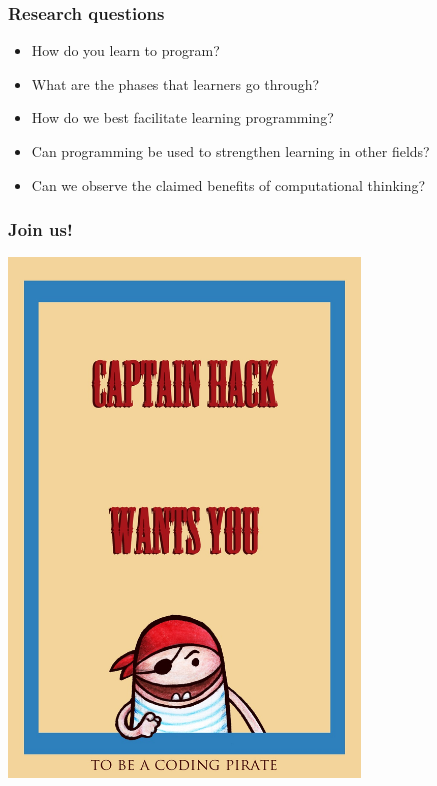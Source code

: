 \documentclass{beamer}
\begin{document}
\begin{frame}
  \frametitle{Research questions}

  \begin{itemize}
  \item How do you learn to program?
  \item What are the phases that learners go through?
  \item How do we best facilitate learning programming?
  \item Can programming be used to strengthen learning in other
    fields? %
  \item Can we observe the claimed benefits of computational thinking?
  \end{itemize}
\end{frame}



\begin{frame}
  \frametitle{Join us!}
  \begin{center}
    \includegraphics[origin=c,angle=-20,width=0.7\textwidth]{imagery/wanted}
  \end{center}

\end{frame}
\end{document}
